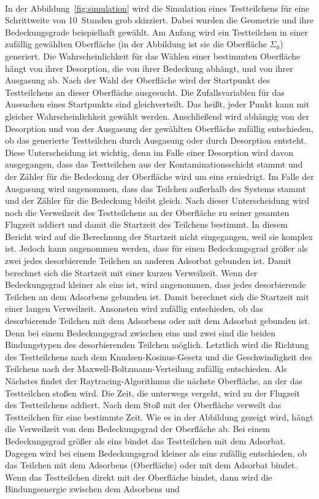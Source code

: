 \documentclass{listhesis}
\begin{document}
\paragraph{}
In der Abbildung~\ref{fig:simulation} wird die Simulation eines Testteilchens für eine Schrittweite von \SI{10}{Stunden} grob skizziert. Dabei wurden die Geometrie und ihre Bedeckungsgrade beispielhaft gewählt. Am Anfang wird ein Testteilchen in einer zufällig gewählten Oberfläche (in der Abbildung ist sie die Oberfläche $\Sigma_0$) generiert. Die Wahrscheinlichkeit für das Wählen einer bestimmten Oberfläche hängt von ihrer Desorption, die von ihrer Bedeckung abhängt, und von ihrer Ausgasung ab. Nach der Wahl der Oberfläche wird der Startpunkt des Testteilchens an dieser Oberfläche ausgesucht. Die Zufallsvariablen für das Aussuchen eines Startpunkts sind gleichverteilt. Das heißt, jeder Punkt kann mit gleicher Wahrscheinlichkeit gewählt werden. Anschließend wird abhängig von der Desorption und von der Ausgasung der gewählten Oberfläche zufällig entschieden, ob das generierte Testteilchen durch Ausgasung oder durch Desorption entsteht. Diese Unterscheidung ist wichtig, denn im Falle einer Desorption wird davon ausgegangen, dass das Testteilchen aus der Kontaminationsschicht stammt und der Zähler für die Bedeckung der Oberfläche wird um eins erniedrigt. Im Falle der Ausgasung wird angenommen, dass das Teilchen außerhalb des Systems stammt und der Zähler für die Bedeckung bleibt gleich. Nach dieser Unterscheidung wird noch die Verweilzeit des Testteilchens an der Oberfläche zu seiner gesamten Flugzeit addiert und damit die Startzeit des Teilchens bestimmt. In diesem Bericht wird auf die Berechnung der Startzeit nicht eingegangen, weil sie komplex ist. Jedoch kann angenommen werden, dass für einen Bedeckungsgrad größer als zwei jedes desorbierende Teilchen an anderen Adsorbat gebunden ist. Damit berechnet sich die Startzeit mit einer kurzen Verweilzeit. Wenn der Bedeckungsgrad kleiner als eins ist, wird angenommen, dass jedes desorbierende Teilchen an dem Adsorbens gebunden ist. Damit berechnet sich die Startzeit mit einer langen Verweilzeit. Ansonsten wird zufällig entschieden, ob das desorbierende Teilchen mit dem Adsorbens oder mit dem Adsorbat gebunden ist. Denn bei einem Bedeckungsgrad zwischen eins und zwei sind die beiden Bindungstypen des desorbierenden Teilchen möglich. Letztlich wird die Richtung des Testteilchens nach dem Knudsen-Kosinus-Gesetz und die Geschwindigkeit des Teilchens nach der Maxwell-Boltzmann-Verteilung zufällig entschieden. Als Nächstes findet der Raytracing-Algorithmus die nächste Oberfläche, an der das Testteilchen stoßen wird. Die Zeit, die unterwegs vergeht, wird zu der Flugzeit des Testteilchens addiert. Nach dem Stoß mit der Oberfläche verweilt das Testteilchen für eine bestimmte Zeit. Wie es in der Abbildung gezeigt wird, hängt die Verweilzeit von dem Bedeckungsgrad der Oberfläche ab. Bei einem Bedeckungsgrad größer als eins bindet das Testteilchen mit dem Adsorbat. Dagegen wird bei einem Bedeckungsgrad kleiner als eins zufällig entschieden, ob das Teilchen mit dem Adsorbens (Oberfläche) oder mit dem Adsorbat bindet. Wenn das Testteilchen direkt mit der Oberfläche bindet, dann wird die Bindungsenergie zwischen dem Adsorbens und 
\end{document}

